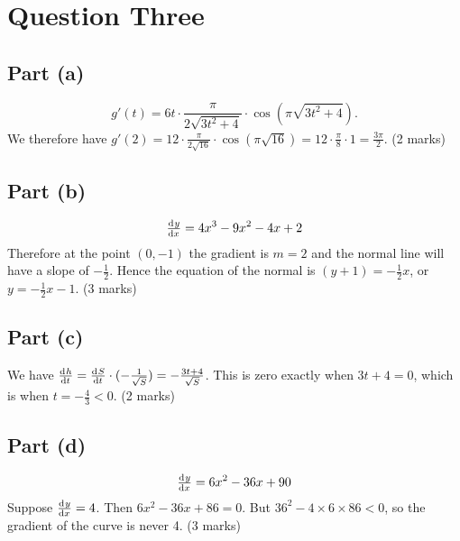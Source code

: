 \documentclass[a4paper]{report}
\begin{document}
\section*{Question Three}
\subsection*{Part (a)}
\begin{displaymath}
  g'(t) = 6t \cdot \frac{\pi}{2\sqrt{3t^2 + 4}} \cdot \cos(\pi\sqrt{3t^2 + 4}).
\end{displaymath}
We therefore have $ g'(2) = 12 \cdot \frac{\pi}{2\sqrt{16}} \cdot \cos(\pi\sqrt{16}) = 12 \cdot \frac{\pi}{8} \cdot 1 = \frac{3\pi}{2} $.
(2 marks)

\subsection*{Part (b)}
\begin{displaymath}
  \od{y}{x} = 4x^3 - 9x^2 - 4x + 2
\end{displaymath}
Therefore at the point $ (0, -1) $ the gradient is $ m = 2 $ and the normal line will have a slope of $ -\frac{1}{2} $.
Hence the equation of the normal is $ (y + 1) = -\frac{1}{2}x $, or $ y = -\frac{1}{2}x - 1 $.
(3 marks)

\subsection*{Part (c)}
We have $ \od{h}{t} = \od{S}{t} \cdot (-\frac{1}{\sqrt{S}}) = -\frac{3t + 4}{\sqrt{S}} $. This is zero exactly when $ 3t + 4 = 0 $,
which is when $ t = -\frac{4}{3} < 0 $.
(2 marks)

\subsection*{Part (d)}
\begin{displaymath}
  \od{y}{x} = 6x^2 - 36x + 90
\end{displaymath}
Suppose $ \od{y}{x} =  4 $. Then $ 6x^2 - 36x + 86 = 0 $. But $ 36^2 - 4\times 6 \times 86 < 0 $, so the
gradient of the curve is never 4.
(3 marks)
\end{document}
